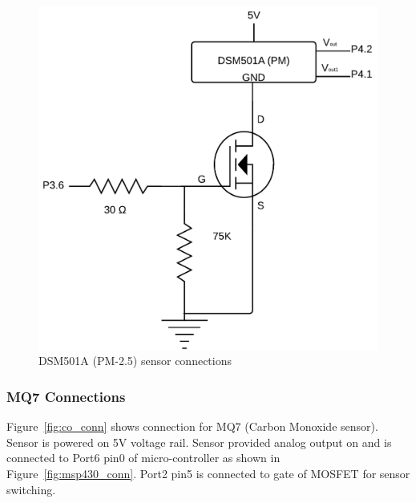 \documentclass[a4paper,12pt]{article}
\begin{document}
\begin{figure}[!ht]
	\centering
	\includegraphics[scale=0.25]{pm2_5.png}
	\caption{DSM501A (PM-2.5) sensor connections}
	\label{fig:pm2_5_conn}
\end{figure}


\subsubsection{MQ7 Connections}
Figure~\ref{fig:co_conn} shows connection for MQ7 (Carbon Monoxide sensor). Sensor is powered on 5V voltage rail. Sensor provided analog output on and is connected to Port6 pin0 of micro-controller as shown in Figure~\ref{fig:msp430_conn}. Port2 pin5 is connected to gate of MOSFET for sensor switching.
\end{document}
